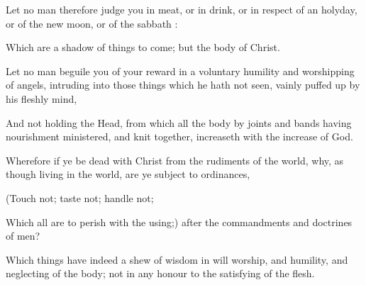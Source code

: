 {Let
no
man
therefore
judge
you
in
meat,
or
in
drink,
or
in
respect of an
holyday,
or of the new
moon,
or of the
sabbath
{}:

Which
are a
shadow of things to
come;
but the
body
{} of
Christ.

Let no
man
beguile
you of your
reward
in a
voluntary
humility
and
worshipping of
angels, intruding
into those things
which he
hath
not
seen,
vainly puffed
up
by
his
fleshly
mind,

And
not
holding the
Head,
from
which
all the
body
by
joints
and
bands having nourishment
ministered,
and knit
together, increaseth
with the
increase of
God.


\par }{\PP {}Wherefore
if ye be
dead
with
Christ
from the
rudiments of the
world,
why, as
though
living
in the
world, are ye subject to
ordinances,

(Touch
not;
taste
not;
handle
not;

Which
all
are
to
perish with the
using;)
after the
commandments
and
doctrines of
men?

Which
things
have
indeed a
shew of
wisdom
in will
worship,
and
humility,
and
neglecting of the
body;
not
in
any
honour
to the
satisfying of the
flesh.




\par }
